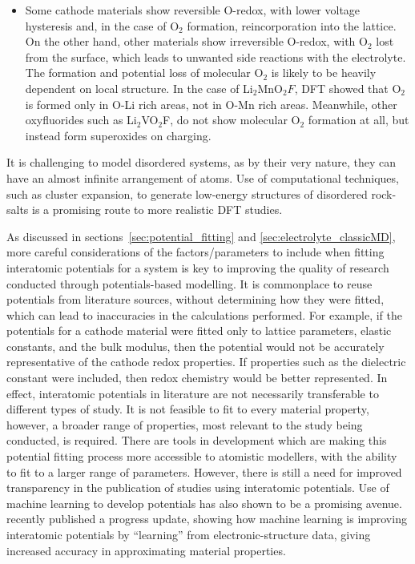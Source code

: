\documentclass[../main.tex]{subfiles}
\begin{document}
\begin{itemize}
    \item Some cathode materials show reversible O-redox, with lower voltage hysteresis and, in the case of O$_2$ formation, reincorporation into the lattice.\cite{Sharpe2020} On the other hand, other materials show irreversible O-redox, with O$_2$ lost from the surface, \cite{Nakayama2020, Chen2016, House2020a} which leads to unwanted side reactions with the electrolyte. The formation and potential loss of molecular O$_2$ is likely to be heavily dependent on local structure. In the case of Li$_2$MnO$_2F$, DFT showed that O$_2$ is formed only in O-Li rich areas, not in O-Mn rich areas.\cite{Sharpe2020} Meanwhile, other oxyfluorides such as Li$_2$VO$_2$F, do not show molecular O$_2$ formation at all, but instead form superoxides on charging.\cite{Chang2020} 
\end{itemize}

It is challenging to model disordered systems, as by their very nature, they can have an almost infinite arrangement of atoms. Use of computational techniques, such as cluster expansion, to generate low-energy structures of disordered rock-salts is a promising route to more realistic DFT studies.\cite{Lun2020}

As discussed in sections~\ref{sec:potential_fitting} and \ref{sec:electrolyte_classicMD}, more careful considerations of the factors/parameters to include when fitting interatomic potentials for a system is key to improving the quality of research conducted through potentials-based modelling. It is commonplace to reuse potentials from literature sources, without determining how they were fitted, which can lead to inaccuracies in the calculations performed. For example, if the potentials for a cathode material were fitted only to lattice parameters, elastic constants, and the bulk modulus, then the potential would not be accurately representative of the cathode redox properties. If properties such as the dielectric constant were included, then redox chemistry would be better represented. In effect, interatomic potentials in literature are not necessarily transferable to different types of study. It is not feasible to fit to every material property, however, a broader range of properties, most relevant to the study being conducted, is required. There are tools in development \cite{gale_empirical_1996, Stukowski_2017, wen_kim-compliant_2017, Morgan2020BuckFit} which are making this potential fitting process more accessible to atomistic modellers, with the ability to fit to a larger range of parameters. However, there is still a need for improved transparency in the publication of studies using interatomic potentials. Use of machine learning to develop potentials has also shown to be a promising avenue. \citeauthor{deringer2019machine} recently published a progress update, showing how machine learning is improving interatomic potentials by ``learning'' from electronic-structure data, giving increased accuracy in approximating material properties. \cite{deringer2019machine}
\end{document}
